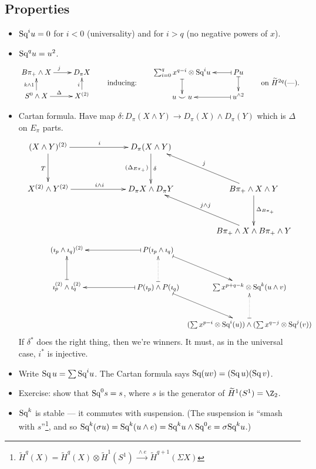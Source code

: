 \documentclass[11pt]{article}
\begin{document}
\begin{SteenrodTalk}
\subsection*{Properties}
\begin{itemize}
\item $\textup{Sq}^i u=0$ for $i<0$ (universality) and for $i>q$ (no negative powers of $x$).
\item $\textup{Sq}^q u=u^2$.
\[\xymatrix@R=.6cm{
B\pi_+ \wedge X \ar[r]^j & D_\pi X \\
S^0 \wedge X  \ar[r]^\Delta\ar[u]^{k\wedge 1} & X^{(2)}\ar[u]^i
}
\raisebox{-.5cm}{\textup{\qquad inducing:\qquad}}
\xymatrix@R=.6cm{
\sum_{i=0}^q x^{q-i} \otimes \Squ^i u\ar@{|->}[d]&
\ar@{|->}[l]  Pu \ar@{|->}[d]\\
u\smile u & u^{\wedge2}\ar@{|->}[l]
}\raisebox{-.5cm}{\textup{\qquad on $\widetilde H^{2q}(\DASH)$.\qquad}}
\]
\item Cartan formula. Have map $\delta:D_\pi(X\wedge Y)\to D_\pi(X)\wedge D_\pi(Y)$ which is $\Delta$ on $E_\pi$ parts.
\[\xymatrix@!0@C=4.4cm@R=1.8cm{
(X\wedge Y)^{(2)}\ar[r]^i\ar[d]_T&D_\pi(X\wedge Y)\ar[d]^{\delta}_{(\Delta_{E\pi_+})}\\
X^{(2)}\wedge Y^{(2)}\ar[r]^{i\wedge i}&D_\pi X\wedge D_\pi Y
&B\pi_+\wedge X\wedge Y\ar[ul]_j\ar[d]^{\Delta_{B\pi_+}}\\
&&B\pi_+\wedge X\wedge B\pi_+\wedge Y\ar[ul]_{j\wedge j}
}\]
\[\qquad\qquad\xymatrix@!0@C=4.4cm@R=1.8cm{
(\imath_p\wedge \imath_q)^{(2)}&
\ar@{|->}[l]  P(\imath_p\wedge\imath_q)\ar@{|->}[dr]\\
\imath_p^{(2)}\wedge \imath_q^{(2)} \ar@{|->}[u]& P(\imath_p)\wedge P(\imath_q)\ar@{|->}[l]\ar@{|..>}[u]
&\sum x^{p+q-k}\otimes\Squ^k(u\wedge v)\\
&&(\sum x^{p-i}\otimes\Squ^i(u))\wedge(\sum x^{q-j}\otimes\Squ^j(v))\ar@{|..>}[u]\ar@{|->}[ul];[]
}\]
If $\delta^*$ does the right thing, then we're winners. It must, as in the universal case, $i^*$ is injective.
\item Write $\textup{Sq}\,u=\sum \textup{Sq}^iu$. The Cartan formula says $\textup{Sq}(uv)=(\textup{Sq}\,u)(\textup{Sq}\,v)$.
\item Exercise: show that $\textup{Sq}^0 s = s$, where $s$ is the generator of $\widetilde H^1 (S^1) = \Z_2$.
\item $\textup{Sq}^k$ is stable --- it commutes with suspension. (The suspension is ``smash with $s$''\footnote{$\widetilde H^q (X)=\widetilde H^q (X)\otimes\widetilde H^1(S^1)\xrightarrow{\ \wedge e\ }\widetilde H^{q+1} (\Sigma X)$}, and so $\textup{Sq}^k(\sigma u) = \textup{Sq}^k(u \wedge e) = \textup{Sq}^k u \wedge \textup{Sq}^0 e = \sigma \textup{Sq}^k u$.)

\end{itemize}
\end{SteenrodTalk}
\end{document}
